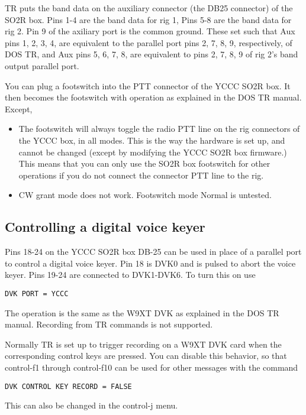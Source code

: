 \documentclass[12pt]{article}
\begin{document}
TR puts the band data
on the auxiliary connector (the DB25 connector)
of the SO2R box. Pins 1-4 are the band data for rig 1, Pins 5-8 are
the band data for rig 2. Pin 9 of the axiliary port is the common ground.
These set such that Aux pins 1, 2, 3, 4,
are equivalent to the parallel port pins 2, 7, 8, 9, respectively, of DOS TR,
and Aux pins 5, 6, 7, 8, are equivalent to pins 2, 7, 8, 9 of rig 2's
band output parallel port.

You can plug a footswitch
into the PTT connector of the YCCC SO2R box.
It then becomes the footswitch with operation as explained in the DOS TR
manual. Except,
\begin{itemize}
\item
The footswitch will always toggle the radio PTT line
on the rig connectors of the YCCC box, in all modes. This is the way the
hardware is set up, and cannot be changed (except by modifying the
YCCC SO2R box firmware.) This means that you can only use the
SO2R box footswitch for other operations if you do not connect the
connector PTT line to the rig.
\item
CW grant mode does not work. Footswitch mode Normal is untested.
\end{itemize}

\subsection{Controlling a digital voice keyer}
Pins 18-24 on the YCCC SO2R box DB-25 can be used in place of a
parallel port to control a digital voice keyer. Pin 18 is DVK0 and is
pulsed to abort the voice keyer. Pins 19-24 are connected to DVK1-DVK6.
To turn this on use
\begin{verbatim}
DVK PORT = YCCC
\end{verbatim}
The operation is the same as the W9XT DVK as explained in the DOS TR
manual. Recording from TR commands is not supported.

Normally TR is set up to trigger recording on a W9XT DVK card when the
corresponding control keys are pressed. You can disable this behavior,
so that control-f1 through control-f10 can be used for other messages
with the command
\begin{verbatim}
DVK CONTROL KEY RECORD = FALSE
\end{verbatim}
This can also be changed in the control-j menu.
\end{document}

